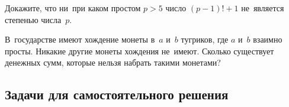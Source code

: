 


Докажите, что ни~при каком простом $p > 5$ число $(p - 1)! + 1$ не~является
степенью числа~$p$.

В~государстве имеют хождение монеты в~$a$ и~$b$ тугриков, где
$a$ и~$b$ взаимно просты.
Никакие другие монеты хождения не~имеют.
Сколько существует денежных сумм, которые нельзя набрать такими монетами?

\subsection*{Задачи для самостоятельного решения}

